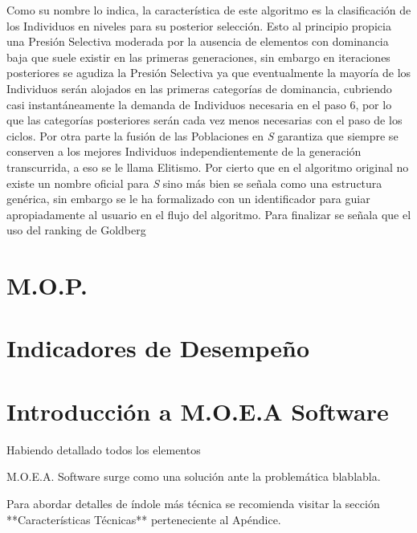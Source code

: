 \documentclass[class=report, crop=false]{standalone}
\begin{document}
Como su nombre lo indica, la característica de este algoritmo es 
la clasificación de los Individuos en niveles para su posterior 
selección.\break
Esto al principio propicia una Presión Selectiva moderada por 
la ausencia de elementos con dominancia baja que suele existir 
en las primeras generaciones, sin embargo en iteraciones posteriores 
se agudiza la Presión Selectiva ya que eventualmente la mayoría de 
los Individuos serán alojados en las primeras categorías de dominancia, 
cubriendo casi instantáneamente la demanda de Individuos necesaria en 
el paso 6, por lo que las categorías posteriores serán cada vez 
menos necesarias con el paso de los ciclos.\medskip\break
Por otra parte la fusión de las Poblaciones en \emph{S} garantiza 
que siempre se conserven a los mejores Individuos independientemente 
de la generación transcurrida, a eso se le llama Elitismo.\break
Por cierto que en el algoritmo original no existe un nombre oficial 
para \emph{S} sino más bien se señala como una estructura genérica, 
sin embargo se le ha formalizado con un identificador para guiar 
apropiadamente al usuario en el flujo del algoritmo.\medskip\break
Para finalizar se señala que el uso del ranking de Goldberg 

\section{M.O.P.}      
\section{Indicadores de Desempeño}
\section{Introducción a M.O.E.A Software}
Habiendo detallado todos los elementos 

M.O.E.A. Software surge como una solución ante la problemática blablabla.

Para abordar detalles de índole más técnica se recomienda visitar la sección **Características Técnicas** perteneciente al Apéndice.

\label{sec:p_1}    

\end{document}

